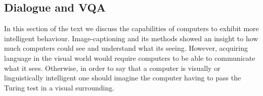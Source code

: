 



\subsection{Dialogue and VQA}


In this section of the text we discuss the capabilities of computers to exhibit more intelligent behaviour. Image-captioning and its methods showed an insight to how much computers could see and understand what its seeing. However, acquiring language in the visual world would require computers to be able to communicate what it sees. Otherwise, in order to say that a computer is visually or linguistically intelligent one should imagine the computer having to pass the Turing test in a visual surrounding. 


